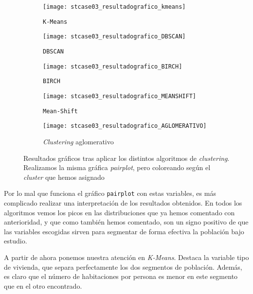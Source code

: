 \documentclass[11pt]{article}
\begin{document}
\begin{figure}[H]
    \centering

    \begin{subfigure}[b]{0.45 \textwidth}
        \texttt{[image: stcase03\_resultadografico\_kmeans]}
        \caption{\lstinline{K-Means}}
    \end{subfigure}
    \begin{subfigure}[b]{0.45 \textwidth}
        \texttt{[image: stcase03\_resultadografico\_DBSCAN]}
        \caption{\lstinline{DBSCAN}}
    \end{subfigure}

    \begin{subfigure}[b]{0.45 \textwidth}
        \texttt{[image: stcase03\_resultadografico\_BIRCH]}
        \caption{\lstinline{BIRCH}}
    \end{subfigure}
    \begin{subfigure}[b]{0.45 \textwidth}
        \texttt{[image: stcase03\_resultadografico\_MEANSHIFT]}
        \caption{\lstinline{Mean-Shift}}
    \end{subfigure}

    \begin{subfigure}[b]{0.45 \textwidth}
        \texttt{[image: stcase03\_resultadografico\_AGLOMERATIVO]}
        \caption{\emph{Clustering} aglomerativo}
    \end{subfigure}


    \caption{Resultados gráficos tras aplicar los distintos algoritmos de \emph{clustering}. Realizamos la misma gráfica \emph{pairplot}, pero coloreando según el \emph{cluster} que hemos asignado}
    \label{stcase03_resultadosgraficos:figure}

\end{figure}

Por lo mal que funciona el gráfico \lstinline{pairplot} con estas variables, es más complicado realizar una interpretación de los resultados obtenidos. En todos los algoritmos vemos los picos en las distribuciones que ya hemos comentado con anterioridad, y que como también hemos comentado, son un signo positivo de que las variables escogidas sirven para segmentar de forma efectiva la población bajo estudio.

A partir de ahora ponemos nuestra atención en \emph{K-Means}. Destaca la variable tipo de vivienda, que separa perfectamente los dos segmentos de población. Además, es claro que el número de habitaciones por persona es menor en este segmento que en el otro encontrado.
\end{document}
